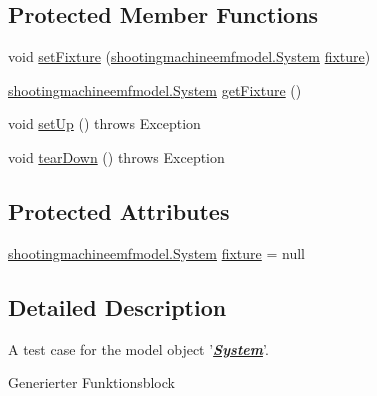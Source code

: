\subsection*{Protected Member Functions}
\begin{DoxyCompactItemize}
\item 
void \hyperlink{classshootingmachineemfmodel_1_1tests_1_1_system_test_ac2604dd06f63bd1f1e19f6d2e0ad8a70}{set\-Fixture} (\hyperlink{interfaceshootingmachineemfmodel_1_1_system}{shootingmachineemfmodel.\-System} \hyperlink{classshootingmachineemfmodel_1_1tests_1_1_system_test_a5f1ad8bbe3989dbc43a1a5b5c898f777}{fixture})
\item 
\hyperlink{interfaceshootingmachineemfmodel_1_1_system}{shootingmachineemfmodel.\-System} \hyperlink{classshootingmachineemfmodel_1_1tests_1_1_system_test_a9b11394604ef0262fc9f26eb0803a078}{get\-Fixture} ()
\item 
void \hyperlink{classshootingmachineemfmodel_1_1tests_1_1_system_test_ac40d6ce8fafaba7e61c1352e777ac68d}{set\-Up} ()  throws Exception 
\item 
void \hyperlink{classshootingmachineemfmodel_1_1tests_1_1_system_test_a11da4ca4544752eaacb20d9920d68d5c}{tear\-Down} ()  throws Exception 
\end{DoxyCompactItemize}
\subsection*{Protected Attributes}
\begin{DoxyCompactItemize}
\item 
\hyperlink{interfaceshootingmachineemfmodel_1_1_system}{shootingmachineemfmodel.\-System} \hyperlink{classshootingmachineemfmodel_1_1tests_1_1_system_test_a5f1ad8bbe3989dbc43a1a5b5c898f777}{fixture} = null
\end{DoxyCompactItemize}


\subsection{Detailed Description}
A test case for the model object '{\itshape {\bfseries \hyperlink{interfaceshootingmachineemfmodel_1_1_system}{System}}}'.

Generierter Funktionsblock 

